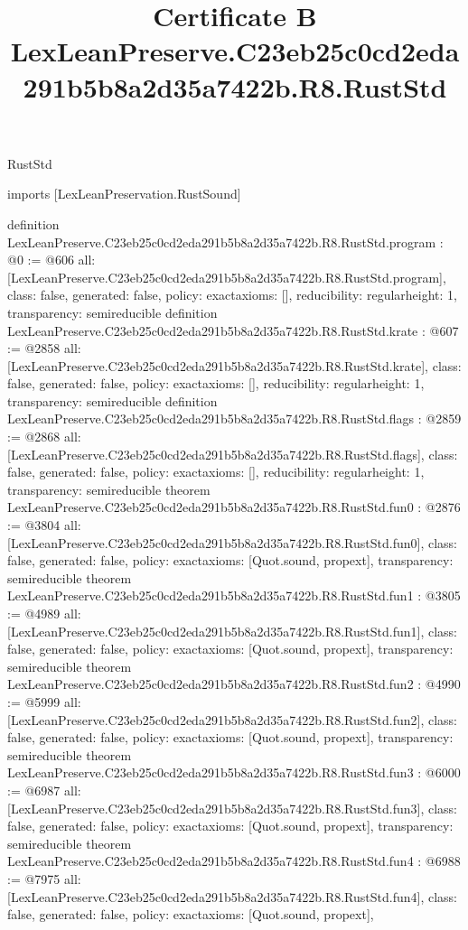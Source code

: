 \begin{lexlean}{RustStd}
\title{Certificate B LexLeanPreserve.C23eb25c0cd2eda291b5b8a2d35a7422b.R8.RustStd}
\begin{coremodule}
imports [LexLeanPreservation.RustSound]

definition LexLeanPreserve.C23eb25c0cd2eda291b5b8a2d35a7422b.R8.RustStd.program : @0 := @606 {
  all: [LexLeanPreserve.C23eb25c0cd2eda291b5b8a2d35a7422b.R8.RustStd.program],
  class: false,
  generated: false,
  policy: exact{axioms: []},
  reducibility: regular{height: 1},
  transparency: semireducible
}
definition LexLeanPreserve.C23eb25c0cd2eda291b5b8a2d35a7422b.R8.RustStd.krate : @607 := @2858 {
  all: [LexLeanPreserve.C23eb25c0cd2eda291b5b8a2d35a7422b.R8.RustStd.krate],
  class: false,
  generated: false,
  policy: exact{axioms: []},
  reducibility: regular{height: 1},
  transparency: semireducible
}
definition LexLeanPreserve.C23eb25c0cd2eda291b5b8a2d35a7422b.R8.RustStd.flags : @2859 := @2868 {
  all: [LexLeanPreserve.C23eb25c0cd2eda291b5b8a2d35a7422b.R8.RustStd.flags],
  class: false,
  generated: false,
  policy: exact{axioms: []},
  reducibility: regular{height: 1},
  transparency: semireducible
}
theorem LexLeanPreserve.C23eb25c0cd2eda291b5b8a2d35a7422b.R8.RustStd.fun0 : @2876 := @3804 {
  all: [LexLeanPreserve.C23eb25c0cd2eda291b5b8a2d35a7422b.R8.RustStd.fun0],
  class: false,
  generated: false,
  policy: exact{axioms: [Quot.sound, propext]},
  transparency: semireducible
}
theorem LexLeanPreserve.C23eb25c0cd2eda291b5b8a2d35a7422b.R8.RustStd.fun1 : @3805 := @4989 {
  all: [LexLeanPreserve.C23eb25c0cd2eda291b5b8a2d35a7422b.R8.RustStd.fun1],
  class: false,
  generated: false,
  policy: exact{axioms: [Quot.sound, propext]},
  transparency: semireducible
}
theorem LexLeanPreserve.C23eb25c0cd2eda291b5b8a2d35a7422b.R8.RustStd.fun2 : @4990 := @5999 {
  all: [LexLeanPreserve.C23eb25c0cd2eda291b5b8a2d35a7422b.R8.RustStd.fun2],
  class: false,
  generated: false,
  policy: exact{axioms: [Quot.sound, propext]},
  transparency: semireducible
}
theorem LexLeanPreserve.C23eb25c0cd2eda291b5b8a2d35a7422b.R8.RustStd.fun3 : @6000 := @6987 {
  all: [LexLeanPreserve.C23eb25c0cd2eda291b5b8a2d35a7422b.R8.RustStd.fun3],
  class: false,
  generated: false,
  policy: exact{axioms: [Quot.sound, propext]},
  transparency: semireducible
}
theorem LexLeanPreserve.C23eb25c0cd2eda291b5b8a2d35a7422b.R8.RustStd.fun4 : @6988 := @7975 {
  all: [LexLeanPreserve.C23eb25c0cd2eda291b5b8a2d35a7422b.R8.RustStd.fun4],
  class: false,
  generated: false,
  policy: exact{axioms: [Quot.sound, propext]},
}
\end{coremodule}
\end{lexlean}
